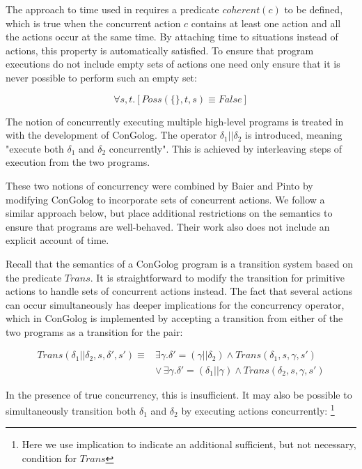 \documentclass[letterpaper]{article}
\begin{document}
The approach to time used in \cite{reiter96sc_nat_conc} requires
a predicate $coherent(c)$ to be defined, which is true when the concurrent
action $c$ contains at least one action and all the actions occur
at the same time. By attaching time to situations instead of actions,
this property is automatically satisfied. To ensure that program executions
do not include empty sets of actions one need only ensure that it
is never possible to perform such an empty set:

\[
\forall s,t.\left[Poss(\{\},t,s)\equiv False\right]
\]


The notion of concurrently executing multiple high-level programs
is treated in \cite{giacomo00congolog} with the development of ConGolog.
The operator $\delta_{1}||\delta_{2}$ is introduced, meaning "execute
both $\delta_{1}$ and $\delta_{2}$ concurrently". This is achieved
by interleaving steps of execution from the two programs.

These two notions of concurrency were combined by Baier and Pinto
\cite{pinto99tcongolog} by modifying ConGolog to incorporate sets
of concurrent actions. We follow a similar approach below, but place
additional restrictions on the semantics to ensure that programs are
well-behaved. Their work also does not include an explicit account
of time.

Recall that the semantics of a ConGolog program is a transition system
based on the predicate $Trans$. It is straightforward to modify the
transition for primitive actions to handle sets of concurrent actions
instead. The fact that several actions can occur simultaneously has
deeper implications for the concurrency operator, which in ConGolog
is implemented by accepting a transition from either of the two programs
as a transition for the pair:

\begin{align*}
Trans(\delta_{1}||\delta_{2},s,\delta',s')\equiv & \exists\gamma.\delta'=(\gamma||\delta_{2})\wedge Trans(\delta_{1},s,\gamma,s')\\
 & \vee\,\exists\gamma.\delta'=(\delta_{1}||\gamma)\wedge Trans(\delta_{2},s,\gamma,s')
\end{align*}


In the presence of true concurrency, this is insufficient. It may
also be possible to simultaneously transition both $\delta_{1}$ and
$\delta_{2}$ by executing actions concurrently:%
\footnote{Here we use implication to indicate an additional sufficient, but
not necessary, condition for $Trans$ %
}
\end{document}
